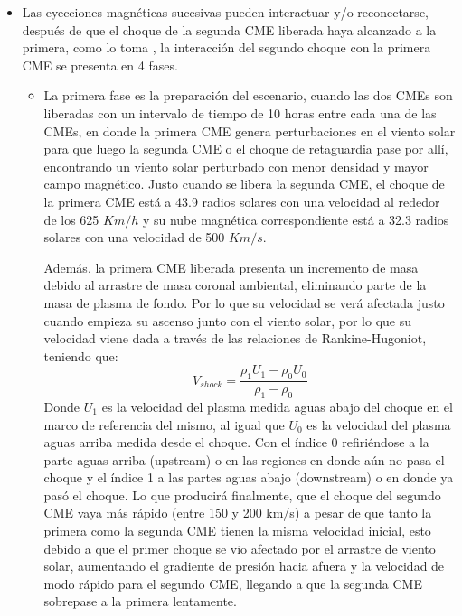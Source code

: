\begin{itemize}
\item Las eyecciones magnéticas sucesivas pueden interactuar y/o reconectarse, después de que el choque de la segunda \ac{CME} liberada haya alcanzado a la primera, como lo toma \cite{lugaz-2005}, la interacción del segundo choque con la primera \ac{CME} se presenta en 4 fases.
\begin{itemize}
    \item La primera fase es la preparación del escenario, cuando las dos \acp{CME} son liberadas con un intervalo de tiempo de 10 horas entre cada una de las CMEs, en donde la primera \ac{CME} genera perturbaciones en el viento solar para que luego la segunda \ac{CME} o el choque de retaguardia pase por allí, encontrando un viento solar perturbado con menor densidad y mayor campo magnético. Justo cuando se libera la segunda CME, el choque de la primera \ac{CME} está a 43.9 radios solares con una velocidad al rededor de los 625 $Km/h$ y su nube magnética correspondiente está a 32.3 radios solares con una velocidad de 500 $Km/s$. 

    Además, la primera \ac{CME} liberada presenta un incremento de masa debido al arrastre de masa coronal ambiental, eliminando parte de la masa de plasma de fondo. Por lo que su velocidad se verá afectada justo cuando empieza su ascenso junto con el viento solar, por lo que su velocidad viene dada a través de las relaciones de Rankine-Hugoniot, teniendo que:
\begin{equation}
    V_{shock}=\frac{\rho_{1}U_{1}-\rho _{0} U_{0}}{\rho_{1}-\rho_{0}}
    \label{Vshock}
\end{equation}
Donde $U_1$ es la velocidad del plasma medida aguas abajo del choque en el marco de referencia del mismo, al igual que $U_0$ es la velocidad del plasma aguas arriba medida desde el choque. Con el índice 0 refiriéndose a la parte aguas arriba (upstream) o en las regiones en donde aún no pasa el choque y el índice 1 a las partes aguas abajo (downstream) o en donde ya pasó el choque. Lo que producirá finalmente, que el choque del segundo \ac{CME} vaya más rápido (entre 150 y 200 km/s) a pesar de que tanto la primera como la segunda \ac{CME} tienen la misma velocidad inicial, esto debido a que el primer choque se vio afectado por el arrastre de viento solar, aumentando el gradiente de presión hacia afuera y la velocidad de modo rápido para el segundo CME, llegando a que la segunda \ac{CME} sobrepase a la primera lentamente.


\end{itemize}
\end{itemize}
